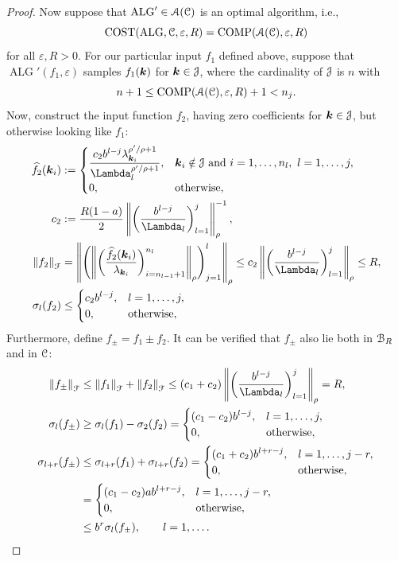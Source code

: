 \documentclass[USenglish]{article}
\theoremstyle{dgthm}
\theoremstyle{dgthm}
\theoremstyle{dgthm}
\theoremstyle{dgthm}
\theoremstyle{dgdef}
\DeclareMathOperator{\ALG}{ALG}
\DeclareMathOperator{\COST}{COST}
\DeclareMathOperator{\COMP}{COMP}
\newcommand{\hf}{\widehat{f}}
\newcommand{\norm}[2][{}]{\ensuremath{\left \lVert #2 \right \rVert}_{#1}}
\begin{document}
\begin{proof}
Now suppose that $\ALG' \in \calA(\calC)$ is an optimal algorithm, i.e., \[\COST(\ALG,\calC,\varepsilon,R) =  \COMP(\calA(\calC),\varepsilon,R)\]
for all $\varepsilon, R > 0$.  For our particular input $f_1$ defined above, suppose that $\ALG'(f_1,\varepsilon)$ samples $f_1({\boldsymbol{k}})$ for ${\boldsymbol{k}} \in {\mathcal{J}}$, where the cardinality of ${\mathcal{J}}$ is $n$ with 
\[
n + 1\le \COMP(\calA(\calC),\varepsilon,R) +1 < n_j.
\]  
Now, construct the input function $f_2$, having zero coefficients for ${\boldsymbol{k}} \in {\mathcal{J}}$, but otherwise looking like $f_1$:
\begin{align}
\nonumber
\hf_2(\bsk_i) &:= \begin{cases}
\displaystyle
\frac{c_2 b^{l-j} \lambda_{\bsk_i}^{\rho'/\rho+1}}{\Lambda_l^{\rho'/\rho+1}},  & \bsk_i \notin \calJ \text{ and } i =  1, \ldots, n_l, \ l = 1, \ldots, j,
\\
0, & \text{otherwise},
\end{cases}
\\
\nonumber
c_2 &:= \frac{R(1-a)}{2} \norm[\rho]{ \biggl(\frac{b^{l-j}}{\Lambda_l} \biggr)_{l=1}^j }^{-1}, \\
\norm[\calF]{f_2} &= \norm[\rho]{\Biggl( \norm[\rho]{\biggl(\frac{\hf_2(\bsk_i)}{\lambda_{\bsk_i}} \biggr)_{i = n_{l-1} + 1}^{n_l}} \Biggr)_{j=1}^l } 
\le  c_2 \norm[\rho]{ \biggl(\frac{b^{l-j}}{\Lambda_l} \biggr)_{l=1}^j } \le R, \\
\sigma_l(f_2) & \le \begin{cases}
\displaystyle
c_2 b^{l-j}, & l =1, \ldots, j, \\
0, & \text{otherwise},
\end{cases}
\end{align}
Furthermore, define $f_{\pm} = f_1 \pm f_2$.
It can be verified that $f_{\pm}$ also lie both in ${\mathcal{B}}_{R}$ and in ${\mathcal{C}}$:
\begin{align}
\nonumber
\norm[\calF]{f_\pm} &\le \norm[\calF]{f_1} + \norm[\calF]{f_2} \le (c_1 + c_2) \norm[\rho]{ \biggl(\frac{b^{l-j}}{\Lambda_l} \biggr)_{l=1}^j } = R,
\\
\nonumber
\sigma_l(f_\pm) & \ge \sigma_l(f_1) - \sigma_2(f_2) = \begin{cases}
\displaystyle
(c_1 - c_2) b^{l-j}, & l =1, \ldots, j, \\
0, & \text{otherwise},
\end{cases}
\\
\nonumber
\sigma_{l+r}(f_\pm) & \le \sigma_{l+r}(f_1) + \sigma_{l+r}(f_2) = \begin{cases}
\displaystyle
(c_1+c_2) b^{l+r-j}, & l =1, \ldots, j-r, \\
0, & \text{otherwise},
\end{cases}
\\
\nonumber
& = \begin{cases}
\displaystyle
(c_1 - c_2) a b^{l+r-j}, & l =1, \ldots, j-r, \\
0, & \text{otherwise},
\end{cases}
\\
\nonumber
& \le b^r \sigma_l(f_\pm), \qquad l =1, \ldots .
\end{align}


\end{proof}
\end{document}
